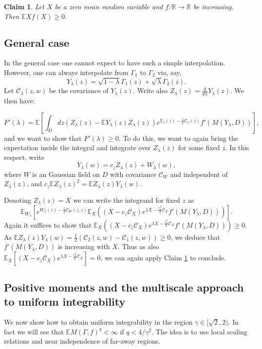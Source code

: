 \documentclass[11pt]{amsart}
\newtheorem{claim}[thm]{Claim}
\newcommand{\R}{\mathbb R}
\newcommand{\C}{\mathcal C}
\newcommand{\E}{\mathbb E}
\renewcommand{\1}{\mathbf 1}
\begin{document}
\begin{claim}\label{clm:elem}
Let $X$ be a zero mean random variable and $f:\R \to \R$ be increasing. Then $\E Xf(X) \geq 0$.
\end{claim}

\subsection*{General case} In the general case one cannot expect to have such a simple interpolation. However, one can always interpolate from $\Gamma_1$ to $\Gamma_2$ via, say, $$Y_\lambda(z) = \sqrt{1-\lambda} \Gamma_1(z) + \sqrt{\lambda} \Gamma_2(z).$$
Let $\C_\lambda(z,w)$ be the covariance of $Y_\lambda(z)$. Write also $Z_\lambda(z) = \frac{d}{d\lambda}Y_\lambda(z)$. We then have:

$$F'(\lambda) = \E \left[\int_D dz (Z_\lambda(z) - \E Y_\lambda(z) Z_\lambda(z)) e^{Y_\lambda(z) - \frac{1}{2}\C_\lambda(z)}f'(M(Y_\lambda, D))\right],$$
and we want to show that $F'(\lambda) \geq 0$.
To do this, we want to again bring the expectation inside the integral and integrate over $Z_\lambda(z)$ for some fixed $z$. In this respect, write $$Y_\lambda(w) = c_zZ_\lambda(z) + W_\lambda(w),$$ where $W$ is an Gaussian field on $D$ with covariance $\C_W$ and independent of $Z_\lambda(z)$, and $c_z \E Z_\lambda(z)^2 = \E Z_\lambda(z) Y_\lambda(w)$. 

Denoting $Z_\lambda(z) = X$ we can write the integrand for fixed $z$ as
$$\E_{W_\lambda}\left[e^{W_\lambda(z) - \frac{1}{2}\C_W(z,z)}\E_X\left((X - c_z\C_X)e^{\lambda X - \frac{c_z^2}{2}\C_X}f'(M(Y_\lambda, D))\right)\right].$$ 
Again it suffices to show that $\E_X\left((X - c_z\C_X)e^{\lambda X - \frac{c_z^2}{2}\C_X}f'(M(Y_\lambda, D))\right) \geq 0$.
As $\E Z_\lambda(z) Y_\lambda(w) = \frac{1}{2}(\C_2(z,w) - \C_1(z,w)) \geq 0$, we deduce that $f'(M(Y_\lambda,D))$ is increasing with $X$. Thus as also $\E_X\left[(X - c_z\C_X)e^{\lambda X - \frac{c_z^2}{2}\C_X}\right] = 0$, we can again apply Claim \ref{clm:elem} to conclude.
\subsection{Positive moments and the multiscale approach to uniform integrability}\label{sec:UI1}

We now show how to obtain uniform integrability in the region $\gamma \in [\sqrt{2}, 2)$. In fact we will see that $\E M(\Gamma,f)^q < \infty$ if $q < 4/\gamma^2$. The idea is to use local scaling relations and near independence of far-away regions. %
\end{document}
